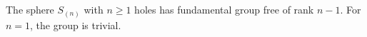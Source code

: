 The sphere $S_{(n)}$ with $n \geq 1$ holes has fundamental group free of rank $n-1$. For $n=1$, the group is trivial.
